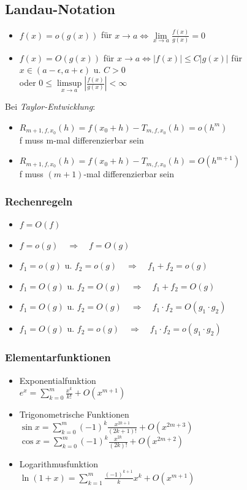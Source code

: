 \documentclass[6pt,a4paper]{scrartcl}
\newcommand{\abs}[1]{\ensuremath{\left\vert#1\right\vert}}
\begin{document}
\begin{multicols*}{4}
\subsection{Landau-Notation}
\begin{itemize}\itemsep-1pt
	\item $f(x) = o(g(x))$ für $x \rightarrow a \Leftrightarrow \lim\limits_{x \rightarrow a} \frac{f(x)}{g(x)} = 0$
	\item $f(x) = O(g(x))$ für $x \rightarrow a \Leftrightarrow |f(x)| \leq C|g(x)|$ für $x \in (a - \epsilon, a + \epsilon)$ u. $C > 0$\\ oder $0 \leq \limsup\limits_{x \rightarrow a} \abs{\frac{f(x)}{g(x)}} < \infty$
\end{itemize}
Bei \emph{Taylor-Entwicklung}:
\begin{itemize}\itemsep-1pt
	\item $R_{m+1,f,x_0}(h) = f(x_0 + h) - T_{m,f,x_0}(h) = o(h^m)$\\ f muss m-mal differenzierbar sein
	\item $R_{m+1,f,x_0}(h) = f(x_0 + h) - T_{m,f,x_0}(h) = O(h^{m+1})$\\ f muss $(m+1)$-mal differenzierbar sein
\end{itemize}
	\subsubsection{Rechenregeln}
	\begin{itemize}\itemsep-1pt
		\item $f = O(f)$
		\item $f = o(g) \quad\Rightarrow\quad f = O(g)$
		\item $f_1 = o(g)$ u. $f_2 = o(g) \quad\Rightarrow\quad f_1 + f_2 = o(g)$
		\item $f_1 = O(g)$ u. $f_2 = O(g) \quad\Rightarrow\quad f_1 + f_2 = O(g)$
		\item $f_1 = O(g)$ u. $f_2 = O(g) \quad\Rightarrow\quad f_1 \cdot f_2 = O(g_1 \cdot g_2)$
		\item $f_1 = O(g)$ u. $f_2 = o(g) \quad\Rightarrow\quad f_1 \cdot f_2 = o(g_1 \cdot g_2)$
	\end{itemize}
	\subsubsection{Elementarfunktionen}
	\begin{itemize}\itemsep-1pt
		\item Exponentialfunktion\\
		$e^x = \sum\limits_{k = 0}^m\frac{x^k}{k!} + O(x^{m + 1})$
		\item Trigonometrische Funktionen\\
		$\sin{x} = \sum\limits_{k = 0}^m(-1)^k\frac{x^{2k + 1}}{(2k + 1)!} + O(x^{2m + 3})$\\
		$\cos{x} = \sum\limits_{k = 0}^m(-1)^k\frac{x^{2k}}{(2k)!} + O(x^{2m + 2})$
		\item Logarithmusfunktion\\
		$\ln{(1 + x)} = \sum\limits_{k = 1}^m\frac{(-1)^{k + 1}}{k}x^k + O(x^{m + 1})$
	\end{itemize}
	

\end{multicols*}
\end{document}
